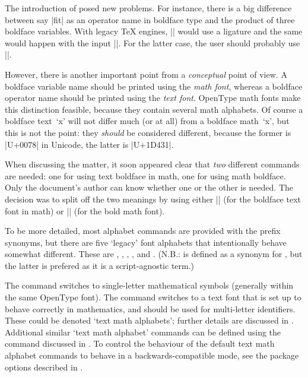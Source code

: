 The introduction of  posed new problems. For
instance, there is a big difference between say |fit| as an operator
name in boldface type and the product of three boldface variables.
With legacy \TeX{} engines, || would use a ligature and
the same would happen with the input ||.
For the latter case, the user should probably use ||.

However, there is another important point from a \emph{conceptual}
point of view. A boldface variable name should be printed using the
\emph{math font}, whereas a boldface operator name should be printed
using the \emph{text font}. OpenType math fonts make this distinction
feasible, because they contain several math alphabets. Of course a
boldface text~`x' will not differ much (or at all) from a boldface
math~`x', but this is not the point: they \emph{should} be considered
different, because the former is |U+0078| in Unicode, the latter is
|U+1D431|.

When discussing the matter, it soon appeared clear that \emph{two}
different commands are needed: one for using text boldface in math,
one for using math boldface. Only the document's author can know
whether one or the other is needed. The decision was to split off
the two meanings by using either |\mathbf| (for the boldface text font
in math) or |\symbf| (for the bold math font).

To be more detailed, most alphabet commands are provided with the
 prefix synonyms, but there are five `legacy' font alphabets
that intentionally behave somewhat different.  These are ,
, , , and .  (N.B.:
 is defined as a synonym for , but the latter is
prefered as it is a script-agnostic term.)

The  command switches to single-letter mathematical symbols
(generally within the same OpenType font).  The  command
switches to a text font that is set up to behave correctly in
mathematics, and should be used for multi-letter identifiers.  These
could be denoted `text math alphabets'; further details are discussed
in .  Additional similar `text math alphabet'
commands can be defined using the  command
discussed in .  To control the behaviour of the
default text math alphabet commands to behave in a
backwards-compatible mode, see the package options described in
.

